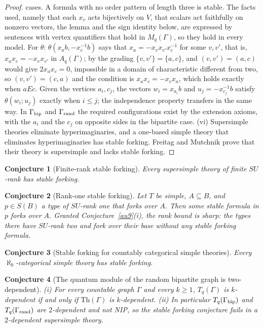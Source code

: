 \documentclass[11pt]{article}
\newtheorem{conjecture}{Conjecture}
\theoremstyle{definition}
\begin{document}
\begin{proof}
cases.  A formula with no order pattern of length three is stable.  The facts used, namely that each $x_v$ acts bijectively on
$V$, that scalars act faithfully on nonzero vectors, the lemma and the
sign identity below, are expressed by sentences with vertex quantifiers
that hold in $M_q(\Gamma)$, so they hold in every model.  For
$\theta$: $\theta(x_ab,-x_c^{-1}b)$ says that $x_a=-x_vx_{v'}x_c^{-1}$ for
some $v,v'$, that is, $x_ax_c=-x_vx_{v'}$ in $A_q(\Gamma)$; by the grading
$\{v,v'\}=\{a,c\}$, and $(v,v')=(a,c)$ would give $2x_ax_c=0$, impossible
in a domain of characteristic different from two, so $(v,v')=(c,a)$ and
the condition is $x_ax_c=-x_cx_a$, which holds exactly when $aEc$.  Given
the vertices $a_i,c_j$, the vectors $w_i=x_{a_i}b$ and $u_j=-x_{c_j}^{-1}b$
satisfy $\theta(w_i;u_j)$ exactly when $i\le j$; the independence property
transfers in the same way.  In $\Gamma_{\rm bip}$ and $\Gamma_{\rm rand}$
the required configurations exist by the extension axioms, with the $a_i$
and the $c_j$ on opposite sides in the bipartite case.
{\rm(vi)} Supersimple theories eliminate hyperimaginaries,
and a one-based simple theory that eliminates hyperimaginaries has stable
forking.  Freitag and Mutchnik prove that their theory is
supersimple and lacks stable forking.
\end{proof}

\begin{conjecture}[Finite-rank stable forking]\label{au1}
Every supersimple theory of finite $SU$-rank has stable forking.
\end{conjecture}


\begin{conjecture}[Rank-one stable forking]\label{au2}
Let $T$ be simple, $A\subseteq B$, and $p\in S(B)$ a type of $SU$-rank one
that forks over $A$.  Then some stable formula in $p$ forks over $A$.  Granted
Conjecture~\ref{au9}(i), the rank bound is sharp: the types there have
$SU$-rank two and fork over their base without any stable forking
formula.
\end{conjecture}


\begin{conjecture}[Stable forking for countably categorical simple theories]\label{au3}
Every $\aleph_0$-categorical simple theory has stable forking.
\end{conjecture}


\begin{conjecture}[The quantum module of the random bipartite graph is two-dependent]\label{au4}
{\rm(i)} For every countable graph $\Gamma$ and every $k\ge1$,
$T_q(\Gamma)$ is $k$-dependent if and only if $\mathrm{Th}(\Gamma)$ is
$k$-dependent.
{\rm(ii)} In particular $T_q(\Gamma_{\rm bip})$ and $T_q(\Gamma_{\rm rand})$
are $2$-dependent and not NIP, so the stable forking conjecture fails in a
$2$-dependent supersimple theory.
\end{conjecture}
\end{document}
